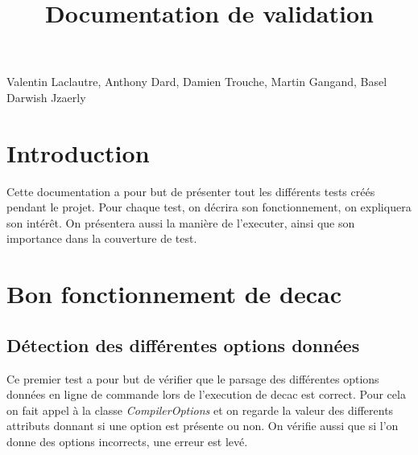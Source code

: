 \documentclass[12pt, a4paper, one side]{article}
\title{Documentation de validation}
\author{}
\date{}
\begin{document}
\maketitle

\begin{center}
    Valentin Laclautre, Anthony Dard, Damien Trouche, Martin Gangand, Basel Darwish Jzaerly
\end{center}

\tableofcontents

\newpage

\section{Introduction}

Cette documentation a pour but de présenter tout les différents tests créés pendant le projet.
Pour chaque test, on décrira son fonctionnement, on expliquera son intérêt. On présentera aussi
la manière de l'executer, ainsi que son importance dans la couverture de test.

\section{Bon fonctionnement de decac}

\subsection{Détection des différentes options données}

Ce premier test a pour but de vérifier que le parsage des différentes options données en ligne
de commande lors de l'execution de decac est correct. Pour cela on fait appel à la classe \textit{CompilerOptions}
et on regarde la valeur des differents attributs donnant si une option est présente ou non. On vérifie aussi que si l'on
donne des options incorrects, une erreur est levé.
\end{document}
